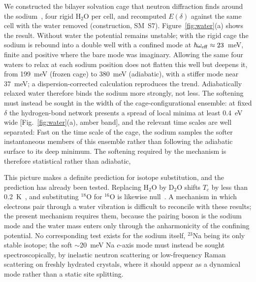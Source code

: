 \documentclass[aps,prl,twocolumn,superscriptaddress,floatfix]{revtex4-2}
\begin{document}
We constructed the bilayer solvation cage that neutron diffraction finds around the
sodium~\cite{Jorgensen2003,Lynn2003}, four rigid H$_2$O per cell, and recomputed $E(\delta)$
against the same cell with the water removed (construction, SM~S7).
Figure~\ref{fig:water}(a) shows the
result. Without water the potential remains unstable; with the rigid cage the sodium is rebound
into a double well with a confined mode at $\hbar\omega_{\rm eff}\approx23$~meV, finite and
positive where the bare mode was imaginary. Allowing the same four waters to relax at each sodium
position does not flatten this well but deepens it, from 199~meV (frozen cage) to 380~meV
(adiabatic), with a stiffer mode near 37~meV; a dispersion-corrected calculation reproduces the
trend. Adiabatically relaxed water therefore binds the sodium more strongly, not less. The
softening must instead be sought in the width of the cage-configurational ensemble: at fixed
$\delta$ the hydrogen-bond network presents a spread of local minima at least 0.4~eV wide
[Fig.~\ref{fig:water}(a), amber band], and the relevant time scales are well separated:  Fast on the time scale of the cage, the sodium samples the
softer instantaneous members of this ensemble rather than following the adiabatic surface to its
deep minimum. The softening required by the mechanism is therefore statistical rather than
adiabatic, 

This picture makes a definite prediction for isotope substitution, and the prediction has already
been tested. Replacing H$_2$O by D$_2$O shifts $T_c$ by less than 0.2~K~\cite{Jin2003}, and
substituting $^{18}$O for $^{16}$O is likewise null~\cite{Yokoi2008}. A mechanism in which
electrons pair through a water vibration is difficult to reconcile with these results; the present
mechanism requires them, because the pairing boson is the sodium mode and the water mass enters
only through the anharmonicity of the confining potential. No corresponding test exists for the
sodium itself, $^{23}$Na being its only stable isotope; the soft $\sim$20~meV Na $c$-axis mode
must instead be sought spectroscopically, by inelastic neutron scattering or low-frequency Raman
scattering on freshly hydrated crystals, where it should appear as a dynamical mode rather than a
static site splitting.
\end{document}
